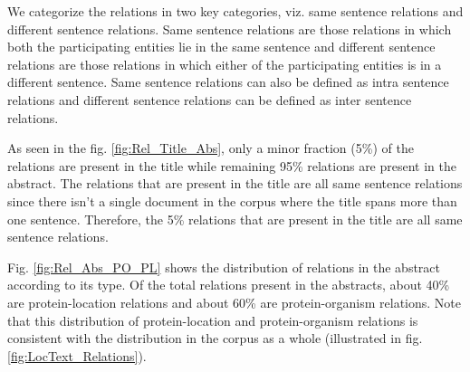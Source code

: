 We categorize the relations in two key categories, viz. same sentence relations and  different sentence relations. Same sentence relations are those relations in which both the participating entities lie in the same sentence and different sentence relations are those relations in which either of the participating entities is in a different sentence. Same sentence relations can also be defined as intra sentence relations and different sentence relations can be defined as inter sentence relations.

As seen in the fig. \ref{fig:Rel_Title_Abs}, only a minor fraction (5\%) of the relations are present in the title while remaining 95\% relations are present in the abstract. The relations that are present in the title are all same sentence relations since there isn't a single document in the corpus where the title spans more than one sentence. Therefore, the 5\% relations that are present in the title are all same sentence relations.

Fig. \ref{fig:Rel_Abs_PO_PL} shows the distribution of relations in the abstract according to its type. Of the total relations present in the abstracts, about 40\% are protein-location relations and about 60\% are protein-organism relations. Note that this distribution of protein-location and protein-organism relations is consistent with the distribution in the corpus as a whole (illustrated in fig. \ref{fig:LocText_Relations}).

